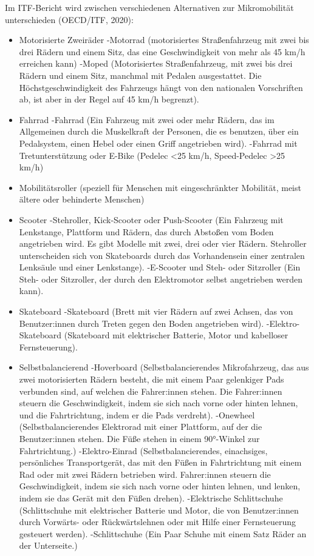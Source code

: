 \documentclass[
]{book}
\providecommand{\tightlist}{%
  \setlength{\itemsep}{0pt}\setlength{\parskip}{0pt}}
\begin{document}
Im ITF-Bericht wird zwischen verschiedenen Alternativen zur Mikromobilität unterschieden (OECD/ITF, 2020):

\begin{itemize}
\tightlist
\item
  Motorisierte Zweiräder
  -Motorrad (motorisiertes Straßenfahrzeug mit zwei bis drei Rädern und einem Sitz, das eine Geschwindigkeit von mehr als 45 km/h erreichen kann)
  -Moped (Motorisiertes Straßenfahrzeug, mit zwei bis drei Rädern und einem Sitz, manchmal mit Pedalen ausgestattet. Die Höchstgeschwindigkeit des Fahrzeugs hängt von den nationalen Vorschriften ab, ist aber in der Regel auf 45 km/h begrenzt).
\item
  Fahrrad
  -Fahrrad (Ein Fahrzeug mit zwei oder mehr Rädern, das im Allgemeinen durch die Muskelkraft der Personen, die es benutzen, über ein Pedalsystem, einen Hebel oder einen Griff angetrieben wird).
  -Fahrrad mit Tretunterstützung oder E-Bike (Pedelec \textless25 km/h, Speed-Pedelec \textgreater25 km/h)
\item
  Mobilitätsroller (speziell für Menschen mit eingeschränkter Mobilität, meist ältere oder behinderte Menschen)
\item
  Scooter
  -Stehroller, Kick-Scooter oder Push-Scooter (Ein Fahrzeug mit Lenkstange, Plattform und Rädern, das durch Abstoßen vom Boden angetrieben wird. Es gibt Modelle mit zwei, drei oder vier Rädern. Stehroller unterscheiden sich von Skateboards durch das Vorhandensein einer zentralen Lenksäule und einer Lenkstange).
  -E-Scooter und Steh- oder Sitzroller (Ein Steh- oder Sitzroller, der durch den Elektromotor selbst angetrieben werden kann).
\item
  Skateboard
  -Skateboard (Brett mit vier Rädern auf zwei Achsen, das von Benutzer:innen durch Treten gegen den Boden angetrieben wird).
  -Elektro-Skateboard (Skateboard mit elektrischer Batterie, Motor und kabelloser Fernsteuerung).
\item
  Selbstbalancierend
  -Hoverboard (Selbstbalancierendes Mikrofahrzeug, das aus zwei motorisierten Rädern besteht, die mit einem Paar gelenkiger Pads verbunden sind, auf welchen die Fahrer:innen stehen. Die Fahrer:innen steuern die Geschwindigkeit, indem sie sich nach vorne oder hinten lehnen, und die Fahrtrichtung, indem er die Pads verdreht).
  -Onewheel (Selbstbalancierendes Elektrorad mit einer Plattform, auf der die Benutzer:innen stehen. Die Füße stehen in einem 90°-Winkel zur Fahrtrichtung.)
  -Elektro-Einrad (Selbstbalancierendes, einachsiges, persönliches Transportgerät, das mit den Füßen in Fahrtrichtung mit einem Rad oder mit zwei Rädern betrieben wird. Fahrer:innen steuern die Geschwindigkeit, indem sie sich nach vorne oder hinten lehnen, und lenken, indem sie das Gerät mit den Füßen drehen).
  -Elektrische Schlittschuhe (Schlittschuhe mit elektrischer Batterie und Motor, die von Benutzer:innen durch Vorwärts- oder Rückwärtslehnen oder mit Hilfe einer Fernsteuerung gesteuert werden).
  -Schlittschuhe (Ein Paar Schuhe mit einem Satz Räder an der Unterseite.)
\end{itemize}
\end{document}
